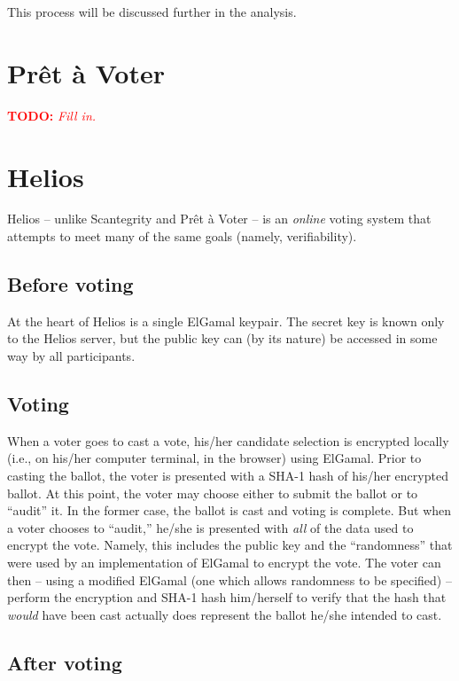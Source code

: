\documentclass[10pt]{article}
\newcommand{\todo}[1]{\textcolor{red}{\textbf{TODO:} \emph{#1}}}
\newcommand{\preta}{Pr\^{e}t \`{a}}
\newcommand{\pv}{\preta{} Voter}
\begin{document}
\begin{multicols}{2}
This process will be discussed further in the analysis.


\section{\pv{}}

\todo{Fill in.}

\section{Helios}

Helios \cite{helios} -- unlike Scantegrity and \pv{} -- is an \emph{online} voting
system that attempts to meet many of the same goals (namely, verifiability).

\subsection{Before voting}

At the heart of Helios is a single ElGamal keypair. The secret key is known only to the Helios
server, but the public key can (by its nature) be accessed in some way by all participants.

\subsection{Voting}

When a voter goes to cast a vote, his/her candidate selection is encrypted locally (i.e., on his/her
computer terminal, in the browser) using ElGamal. Prior to casting the ballot, the voter is
presented with a SHA-1 hash of his/her encrypted ballot. At this point, the voter may choose either
to submit the ballot or to ``audit'' it. In the former case, the ballot is cast and voting is
complete. But when a voter chooses to ``audit,'' he/she is presented with \emph{all} of the data
used to encrypt the vote. Namely, this includes the public key and the ``randomness'' that were used
by an implementation of ElGamal to encrypt the vote. The voter can then -- using a modified ElGamal
(one which allows randomness to be specified) -- perform the encryption and SHA-1 hash him/herself
to verify that the hash that \emph{would} have been cast actually does represent the ballot he/she
intended to cast.

\subsection{After voting}


\end{multicols}
\end{document}
